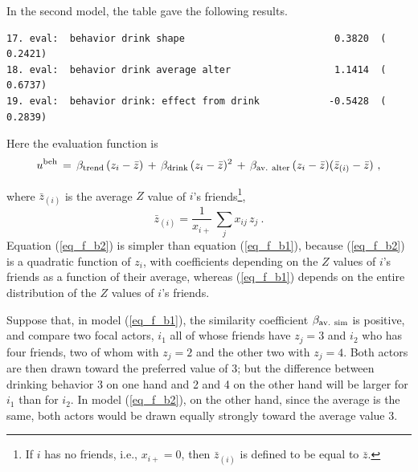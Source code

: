 \documentclass[a4paper,fleqn]{article}
\newcommand{\+}{\, + \,}
\begin{document}
{\noindent
In the second model, the table gave the following results.
\begin{verbatim}
17. eval:  behavior drink shape                          0.3820  (   0.2421)
18. eval:  behavior drink average alter                  1.1414  (   0.6737)
19. eval:  behavior drink: effect from drink            -0.5428  (   0.2839)
\end{verbatim}
Here the evaluation function is
\begin{equation}
   u^{\rm beh} \,=\, \beta_{\rm trend} \, (z_i - \bar z) \,+\, \beta_{\rm drink} \, (z_i - \bar z)^2 \,+\,
                   \beta_{\rm av.\ alter}\,  (z_i - \bar z)(\bar z_{(i)} - \bar z)  \ ,
                    \label{eq_f_b2}
\end{equation}

\noindent
where $\bar z_{(i)} $ is the average $Z$ value of $i$'s
friends\footnote{If $i$ has no friends, i.e., $x_{i+} = 0$,  then $\bar z_{(i)} $ is defined
to be equal to $\bar z$.},
\[
  \bar z_{(i)}  =\frac{1}{x_{i+}} \, \sum_j x_{ij}\, z_j   \ .
\]
Equation (\ref{eq_f_b2}) is simpler than equation (\ref{eq_f_b1}), because
(\ref{eq_f_b2}) is a quadratic function of $z_i$, with coefficients depending
on the $Z$ values of $i$'s friends as a function of their average,
whereas (\ref{eq_f_b1}) depends on the entire distribution
of the $Z$ values of $i$'s friends.

Suppose that, in model (\ref{eq_f_b1}),
the similarity coefficient $\beta_{\rm av.\ sim}$ is positive,
and compare two focal actors,
$i_1$  all of whose friends have $z_j = 3$
and $i_2$ who has four friends, two of whom with
$z_j = 2$ and the other two with $z_j = 4$.
Both actors are then drawn toward the preferred value
of 3; but the difference between drinking behavior 3 on one hand
and 2 and 4 on the other hand will be larger for $i_1$
than for $i_2$.
In model (\ref{eq_f_b2}), on the other hand,
since the average is the same,
both actors would be drawn equally strongly toward
the average value 3.

}
\end{document}
